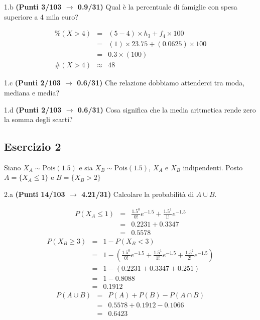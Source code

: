 \documentclass[
  11pt,
]{book}
\theoremstyle{mytheoremstyle}
\theoremstyle{mydefstyle}
\newenvironment{sol}
  {
  \begin{tcolorbox}[enhanced,breakable,arc=0.1mm,boxrule=1pt,colback=white,colframe=iblue,
  title=\bf \fontfamily{lmss}\selectfont \hspace{.5 cm} Soluzione,drop fuzzy shadow]

}{
\end{tcolorbox}
  }
\begin{document}
1.b \textbf{(Punti 3/103 \(\rightarrow\) 0.9/31)} Qual è la percentuale di famiglie con spesa superiore a 4 mila euro?

\begin{sol}
\begin{eqnarray*}
     \%(X> 4 ) &=& ( 5 - 4 )\times h_{ 3 }+ f_{ 4 }\times 100 \\
              &=& ( 1 )\times 23.75 + ( 0.0625 )\times 100 \\
              &=&  0.3 \times(100)\\
     \#(X> 4 ) &\approx& 48 
         \end{eqnarray*}

\end{sol}

1.c \textbf{(Punti 2/103 \(\rightarrow\) 0.6/31)} Che relazione dobbiamo attenderci tra moda, mediana e media?

1.d \textbf{(Punti 2/103 \(\rightarrow\) 0.6/31)} Cosa significa che la media aritmetica rende zero la somma degli scarti?

\subsection{Esercizio 2}\label{esercizio-2-25}

Siano \(X_A\sim \text{Pois}(1.5)\) e sia \(X_B\sim \text{Pois}(1.5)\), \(X_A\) e \(X_B\) indipendenti. Posto \(A=\{X_A\le 1\}\) e \(B=\{X_B>2\}\)

2.a \textbf{(Punti 14/103 \(\rightarrow\) 4.21/31)} Calcolare la probabilità di \(A\cup B\).

\begin{sol}
\begin{eqnarray*}
   P( X_A \leq 1 ) &=& \frac{ 1.5 ^{ 0 }}{ 0 !}e^{- 1.5 }+\frac{ 1.5 ^{ 1 }}{ 1 !}e^{- 1.5 } \\                 &=& 0.2231+0.3347 \\                 &=& 0.5578 
\end{eqnarray*}
\begin{eqnarray*}
   P( X_B \geq 3 ) &=& 1-P( X_B < 3 ) \\                 &=& 1-\left( \frac{ 1.5 ^{ 0 }}{ 0 !}e^{- 1.5 }+\frac{ 1.5 ^{ 1 }}{ 1 !}e^{- 1.5 }+\frac{ 1.5 ^{ 2 }}{ 2 !}e^{- 1.5 } \right)\\                 &=& 1-( 0.2231+0.3347+0.251 )\\                 &=& 1- 0.8088 \\                 &=&   0.1912 
\end{eqnarray*}
\begin{eqnarray*}
  P(A\cup B) &=&  P(A)+P(B)-P(A\cap B)\\
  &=& 0.5578+0.1912-0.1066\\
  &=& 0.6423
\end{eqnarray*}

\end{sol}
\end{document}
